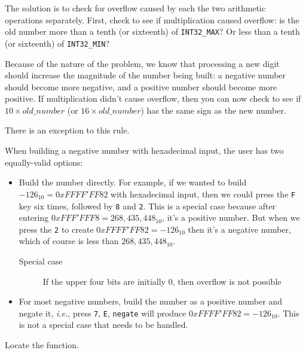 The solution is to check for overflow caused by each the two arithmetic operations separately.
First, check to see if multiplication caused overflow:
is the old number more than a tenth (or sixteenth) of \lstinline{INT32_MAX}?
Or less than a tenth (or sixteenth) of \lstinline{INT32_MIN}?

Because of the nature of the problem, we know that processing a new digit should increase the magnitude of the number being built:
a negative number should become more negative, and a positive number should become more positive.
If multiplication didn't cause overflow, then you can now check to see if $10 \times old\_number$ (or $16 \times old\_number$) has the same sign as the new number.

There is an exception to this rule.

When building a negative number with hexadecimal input, the user has two equally-valid options:

\begin{itemize}
    \item Build the number directly.
        For example, if we wanted to build $-126_{10} = 0xFFFF'FF82$ with hexadecimal input, then we could press the \texttt{F} key six times, followed by \texttt{8} and \texttt{2}.
        This is a special case because after entering $0xFFF'FFF8 = 268,435,448_{10}$, it's a positive number.
        But when we press the \texttt{2} to create $0xFFFF'FF82 = -126_{10}$ then it's a negative number, which of course is less than $268,435,448_{10}$.
        \begin{description}
            \item[Special case] If the upper four bits are initially 0, then overflow is not possible
        \end{description}
    \item For most negative numbers, build the number as a positive number and negate it,
        \textit{i.e.}, press \texttt{7}, \texttt{E}, \texttt{negate} will produce $0xFFFF'FF82 = -126_{10}$.
        This is not a special case that needs to be handled.
\end{itemize}

Locate the  function.
\begin{description}
\end{description}

